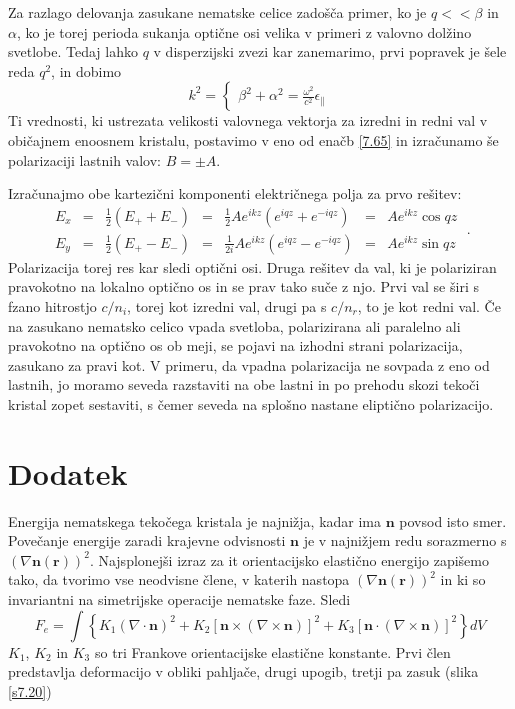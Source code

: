 Za razlago delovanja zasukane nematske celice zadošča primer, ko je
$q<<\beta$ in $\alpha$, ko je torej perioda sukanja optične osi
velika v primeri z valovno dolžino svetlobe. Tedaj lahko $q$ v disperzijski
zvezi kar zanemarimo, prvi popravek je šele reda $q^{2}$, in dobimo
\begin{equation}
k^{2}=\left\{ \begin{matrix}\beta^{2}+\alpha^{2}=\frac{\omega^{2}}{c^{2}}\epsilon_{\parallel}\end{matrix}\right.\label{7.67}
\end{equation}
 Ti vrednosti, ki ustrezata velikosti valovnega vektorja za izredni
in redni val v običajnem enoosnem kristalu, postavimo v eno od enačb
\ref{7.65} in izračunamo še polarizaciji lastnih valov: $B=\pm A$.

Izračunajmo obe kartezični komponenti električnega polja za prvo rešitev:
\begin{equation}
\begin{array}{lclclcl}
E_{x} & = & \frac{1}{2}(E_{+}+E_{-}) & = & \frac{1}{2}Ae^{ikz}(e^{iqz}+e^{-iqz}) & = & Ae^{ikz}\cos qz\\
E_{y} & = & \frac{1}{2}(E_{+}-E_{-}) & = & \frac{1}{2i}Ae^{ikz}(e^{iqz}-e^{-iqz}) & = & Ae^{ikz}\sin qz
\end{array}\;.\label{7.68}
\end{equation}
 Polarizacija torej res kar sledi optični osi. Druga rešitev da val,
ki je polariziran pravokotno na lokalno optično os in se prav tako
suče z njo. Prvi val se širi s fzano hitrostjo $c/n_{i}$, torej kot
izredni val, drugi pa s $c/n_{r}$, to je kot redni val. Če na zasukano
nematsko celico vpada svetloba, polarizirana ali paralelno ali pravokotno
na optično os ob meji, se pojavi na izhodni strani polarizacija, zasukano
za pravi kot. V primeru, da vpadna polarizacija ne sovpada z eno od
lastnih, jo moramo seveda razstaviti na obe lastni in po prehodu skozi
tekoči kristal zopet sestaviti, s čemer seveda na splošno nastane eliptično
polarizacijo.


\section{Dodatek}

Energija nematskega tekočega kristala je najnižja, kadar ima $\mathbf{n}$
povsod isto smer. Povečanje energije zaradi krajevne odvisnosti $\mathbf{n}$
je v najnižjem redu sorazmerno s $(\nabla\mathbf{n}(\mathbf{r}))^{2}$.
Najsplo\textquotedbl{}nejši izraz za {it orientacijsko elastično
energijo} zapišemo tako, da tvorimo vse neodvisne člene, v katerih
nastopa $(\nabla\mathbf{n}(\mathbf{r}))^{2}$ in ki so invariantni na simetrijske
operacije nematske faze. Sledi\cite{degennes} 
\begin{equation}
F_{e}=\int\left\{ K_{1}(\nabla\cdot\mathbf{n})^{2}+K_{2}[\mathbf{n}\times(\nabla\times\mathbf{n})]^{2}+K_{3}[\mathbf{n}\cdot(\nabla\times\mathbf{n})]^{2}\right\} dV\label{7.70}
\end{equation}
 $K_{1}$, $K_{2}$ in $K_{3}$ so tri Frankove orientacijske elastične
konstante. Prvi člen predstavlja deformacijo v obliki pahljače, drugi
upogib, tretji pa zasuk (slika \ref{s7.20})

